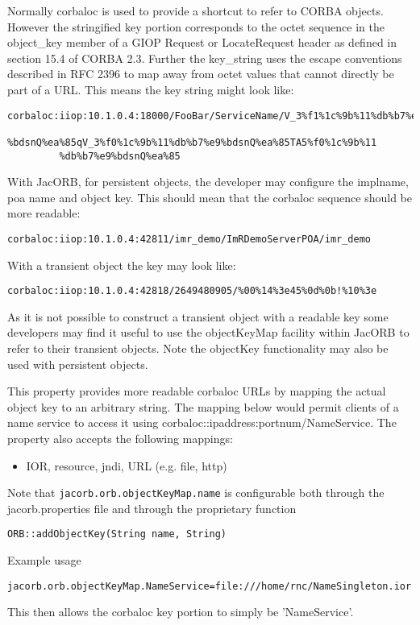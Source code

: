 {{Normally corbaloc is used to provide a shortcut to refer to CORBA objects. However the stringified key portion corresponds to the octet sequence in the object\_key member of a GIOP Request or LocateRequest header as defined in section 15.4 of CORBA 2.3. Further the key\_string uses the escape conventions described in RFC 2396 to map away from octet values that cannot directly be part of a URL. This means the key string might look like:
\small{
\begin{verbatim}
corbaloc:iiop:10.1.0.4:18000/FooBar/ServiceName/V_3%f1%1c%9b%11%db%b7%e9
         %bdsnQ%ea%85qV_3%f0%1c%9b%11%db%b7%e9%bdsnQ%ea%85TA5%f0%1c%9b%11
         %db%b7%e9%bdsnQ%ea%85
\end{verbatim}
}
With JacORB, for persistent objects, the developer may configure the implname, poa name and object key. This should mean that the corbaloc sequence should be more readable:
\small{
\begin{verbatim}
corbaloc:iiop:10.1.0.4:42811/imr_demo/ImRDemoServerPOA/imr_demo
\end{verbatim}
}
With a transient object the key may look like:
\small{
\begin{verbatim}
corbaloc:iiop:10.1.0.4:42818/2649480905/%00%14%3e45%0d%0b!%10%3e
\end{verbatim}
}
As it is not possible to construct a transient object with a readable key some developers may find it useful to use the objectKeyMap facility within JacORB to refer to their transient objects. Note the objectKey functionality may also be used with persistent objects.

This property provides more readable corbaloc URLs by mapping the actual object key to an arbitrary string. The mapping below would permit clients of a name service to access it using corbaloc::ipaddress:portnum/NameService. The property also accepts the following mappings:
\begin{itemize}
\item IOR, resource, jndi, URL (e.g. file, http)
\end{itemize}
Note that {\tt jacorb.orb.objectKeyMap.name} is configurable both through the jacorb.properties file and through the proprietary function

{\tt ORB::addObjectKey(String name, String)}

Example usage

{\tt jacorb.orb.objectKeyMap.NameService=file:///home/rnc/NameSingleton.ior}

This then allows the corbaloc key portion to simply be 'NameService'.

}}

